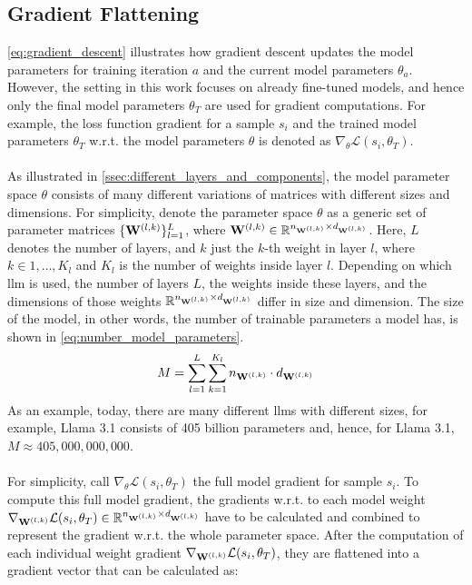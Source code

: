\subsection{Gradient Flattening}\label{subsec:gradient_flattening}
\autoref{eq:gradient_descent} illustrates how gradient descent updates the model parameters for training iteration $a$ and the current model parameters $\theta_a$. However, the setting in this work focuses on already fine-tuned models, and hence only the final model parameters $\theta_T$ are used for gradient computations. For example, the loss function gradient for a sample $s_i$ and the trained model parameters $\theta_T$ w.r.t. the model parameters $\theta$ is denoted as $\nabla_{\theta} \mathcal{L}(s_i, \theta_T)$.
\\\\
As illustrated in \autoref{ssec:different_layers_and_components}, the model parameter space $\theta$ consists of many different variations of matrices with different sizes and dimensions. For simplicity, denote the parameter space $\theta$ as a generic set of parameter matrices
$\{\mathbf{W}^{(l,k)}\}_{l=1}^L$, where $\mathbf{W}^{(l,k)} \in \mathbb{R}^{n_{\mathbf{W}^{(l,k)}} \times d_{\mathbf{W}^{(l,k)}}}$. Here, $L$ denotes the number of layers, and $k$ just the $k$-th weight in layer $l$, where $k \in 1,\dots,K_l$ and $K_l$ is the number of weights inside layer $l$. Depending on which \acrshort{llm} is used, the number of layers $L$, the weights inside these layers, and the dimensions of those weights $\mathbb{R}^{n_{\mathbf{W}^{(l,k)}} \times d_{\mathbf{W}^{(l,k)}}}$ differ in size and dimension. The size of the model, in other words, the number of trainable parameters a model has, is shown in \autoref{eq:number_model_parameters}.
\begin{equation}
    M = \sum_{l=1}^{L} \sum_{k=1}^{K_l} n_{\mathbf{W}^{(l,k)}} \cdot d_{\mathbf{W}^{(l,k)}}
    \label{eq:number_model_parameters}
\end{equation}
As an example, today, there are many different \acrlong{llm}s with different sizes, for example, Llama 3.1 consists of 405 billion parameters \cite{DBLP:journals/corr/abs-2407-21783} and, hence, for Llama 3.1, $M \approx 405,000,000,000$.
\\\\
For simplicity, call $\nabla_{\theta} \mathcal{L}(s_i, \theta_T)$ the full model gradient for sample $s_i$. To compute this full model gradient, the gradients w.r.t. to each model weight $\nabla_{\mathbf{W}^{(l,k)}} \mathcal{L}(s_i, \theta_T) \in \mathbb{R}^{n_{\mathbf{W}^{(l,k)}} \times d_{\mathbf{W}^{(l,k)}}}$ have to be calculated and combined to represent the gradient w.r.t. the whole parameter space. After the computation of each individual weight gradient $\nabla_{\mathbf{W}^{(l,k)}} \mathcal{L}(s_i, \theta_T)$, they are flattened into a gradient vector that can be calculated as: 
